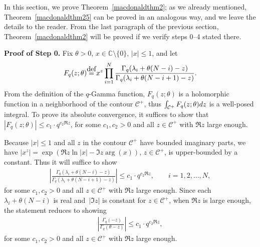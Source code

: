 \documentclass[11pt]{article}
\numberwithin{equation}{section}
\newcommand\myeq{\mathrel{\stackrel{\makebox[0pt]{\mbox{\normalfont\tiny def}}}{=}}}
\newcommand{\C}{\mathbb{C}}
\newcommand{\CC}{\mathcal{C}}
\begin{document}
In this section, we prove Theorem~\ref{macdonaldthm2}; as we already mentioned, Theorem~\ref{macdonaldthm25} can be proved in an analogous way, and we leave the details to the reader. From the last paragraph of the previous section, Theorem~\ref{macdonaldthm2} will be proved if we verify steps 0--4 stated there.

\textbf{Proof of Step 0.} Fix $\theta>0$, $x\in\C \setminus \{0\}$, $|x|\leq 1$, and let
\begin{gather*}
F_q(z; \theta) \myeq x^z\prod\limits_{i=1}^N{\frac{\Gamma_q(\lambda_i + \theta(N-i) - z)}{\Gamma_q(\lambda_i + \theta(N-i+1) - z)}}.
 \end{gather*} From the def\/inition of the $q$-Gamma function, $F_q(z; \theta)$ is a holomorphic function in a neighborhood of the contour $\CC^+$, thus $\int_{\CC^+}{F_q(z; \theta){\rm d}z}$ is a well-posed integral. To prove its absolute convergence, it suf\/f\/ices to show that $|F_q(z; \theta)| \leq c_1\cdot q^{c_2 \Re z}$, for some $c_1, c_2 > 0$ and all $z\in\CC^+$ with $\Re z$ large enough.

Because $|x|\leq 1$ and all $z$ in the contour $\CC^+$ have bounded imaginary parts, we have $|x^z| = \exp(\Re z \ln{|x|} - \Im z \arg(x))$, $z\in\CC^+$, is upper-bounded by a constant. Thus it will suf\/f\/ice to show
\begin{gather*}
\left|\frac{\Gamma_q(\lambda_i + \theta(N - i) - z)}{\Gamma_q(\lambda_i + \theta(N - i + 1) - z)}\right| \leq c_1\cdot q^{c_2 \Re z}, \qquad i = 1, 2, \dots, N,
\end{gather*}
for some $c_1, c_2 > 0$ and all $z\in\CC^+$ with $\Re z$ large enough. Since each $\lambda_i + \theta(N-i)$ is real and~$|\Im z|$ is constant for $z\in\CC^+$, when $\Re z$ is large enough, the statement reduces to showing
\begin{gather}\label{toproveineqgamma}
\left|\frac{\Gamma_q(- z)}{\Gamma_q(\theta - z)}\right| \leq c_1\cdot q^{c_2 \Re z},
\end{gather}
for some $c_1, c_2 > 0$ and all $z\in\CC^+$ with $\Re z$ large enough.
\end{document}
